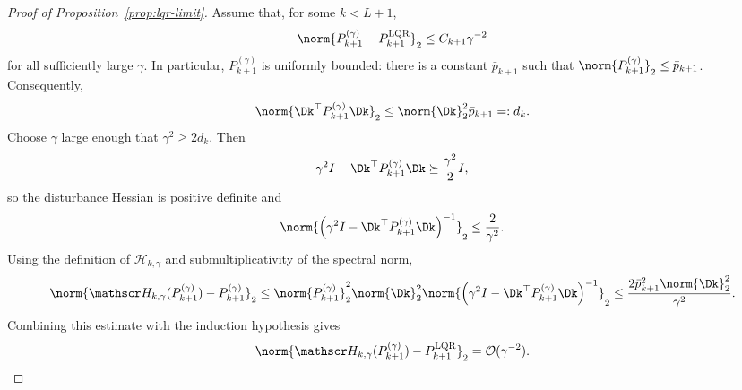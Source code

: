 \begin{proof}[Proof of Proposition~\ref{prop:lqr-limit}]
Assume that, for some $k<L+1$,
$$
\norm{P_{k+1}^{(\gamma)}-P_{k+1}^{\mathrm{LQR}}}_2
\leq
C_{k+1}\gamma^{-2}
$$
for all sufficiently large $\gamma$.  In particular,
$P_{k+1}^{(\gamma)}$ is uniformly bounded: there is a constant
$\bar p_{k+1}$
such that
$\norm{P_{k+1}^{(\gamma)}}_2\leq\bar p_{k+1}$.
Consequently,
$$
\norm{
\Dk^\top P_{k+1}^{(\gamma)}\Dk
}_2
\leq
\norm{\Dk}_2^2\bar p_{k+1}
=:
d_k.
$$
Choose $\gamma$ large enough that $\gamma^2\geq2d_k$.  Then
$$
\gamma^2I-\Dk^\top P_{k+1}^{(\gamma)}\Dk
\succeq
\frac{\gamma^2}{2}I,
$$
so the disturbance Hessian is positive definite and
$$
\norm{
\left(
\gamma^2I-\Dk^\top P_{k+1}^{(\gamma)}\Dk
\right)^{-1}
}_2
\leq
\frac{2}{\gamma^2}.
$$
Using the definition of $\mathscr H_{k,\gamma}$ and submultiplicativity of the
spectral norm,
$$
\norm{
\mathscr H_{k,\gamma}(P_{k+1}^{(\gamma)})
-P_{k+1}^{(\gamma)}
}_2
\leq
\norm{P_{k+1}^{(\gamma)}}_2^2
\norm{\Dk}_2^2
\norm{
\left(
\gamma^2I-\Dk^\top P_{k+1}^{(\gamma)}\Dk
\right)^{-1}
}_2
\leq
\frac{
2\bar p_{k+1}^2\norm{\Dk}_2^2
}{\gamma^2}.
$$
Combining this estimate with the induction hypothesis gives
$$
\norm{
\mathscr H_{k,\gamma}(P_{k+1}^{(\gamma)})
-P_{k+1}^{\mathrm{LQR}}
}_2
=
\mathcal O(\gamma^{-2}).
$$


\end{proof}
